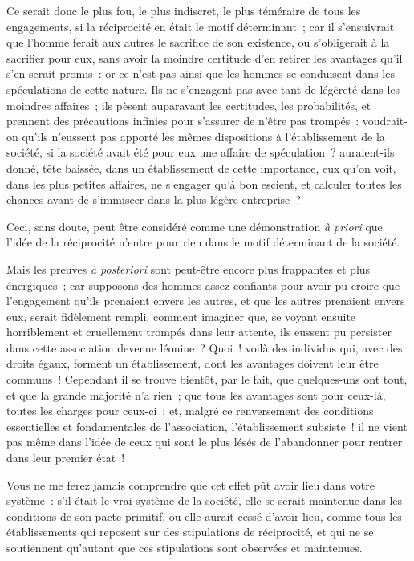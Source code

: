 \documentclass[french,twoside]{book} %
\begin{document}
Ce serait donc le plus fou, le plus indiscret, le plus téméraire de tous les engagements, si la réciprocité en était le motif déterminant ; car il s’ensuivrait que l’homme ferait aux autres le sacrifice de son existence, ou s’obligerait à la sacrifier pour eux, sans avoir la moindre certitude d’en retirer les avantages qu’il s’en serait promis : or ce n’est pas ainsi que les hommes se conduisent dans les spéculations de cette nature. Ils ne s’engagent pas avec tant de légèreté dans les moindres affaires ; ils pèsent auparavant les certitudes, les probabilités, et prennent des précautions infinies pour s’assurer de n’être pas trompés : voudrait-on qu’ils n’eussent pas apporté les mêmes dispositions à l’établissement de la société, si la société avait été pour eux une affaire de spéculation ? auraient-ils donné, tête baissée, dans un établissement de cette importance, eux qu’on voit, dans les plus petites affaires, ne s’engager qu’à bon escient, et calculer toutes les chances avant de s’immiscer dans la plus légère entreprise ?\par
Ceci, sans doute, peut être considéré comme une démonstration {\itshape à priori} que l’idée de la réciprocité n’entre pour rien dans le motif déterminant de la société.\par
Mais les preuves {\itshape à posteriori} sont peut-être encore plus frappantes et plus énergiques ; car supposons des hommes assez confiants pour avoir pu croire que l’engagement qu’ils prenaient envers les autres, et que les autres prenaient envers eux, serait fidèlement rempli, comment imaginer que, se voyant ensuite horriblement et cruellement trompés dans leur attente, ils eussent pu persister dans cette association devenue léonine ? Quoi ! voilà des individus qui, avec des droits égaux, forment un établissement, dont les avantages doivent leur être communs ! Cependant il se trouve bientôt, par le fait, que quelques-uns ont tout, et que la grande majorité n’a rien ; que tous les avantages sont pour ceux-là, toutes les charges pour ceux-ci ; et, malgré ce renversement des conditions essentielles et fondamentales de l’association, l’établissement subsiste ! il ne vient pas même dans l’idée de ceux qui sont le plus lésés de l’abandonner pour rentrer dans leur premier état !\par
Vous ne me ferez jamais comprendre que cet effet pût avoir lieu dans votre système : s’il était le vrai système de la société, elle se serait maintenue dans les conditions de son pacte primitif, ou elle aurait cessé d’avoir lieu, comme tous les établissements qui reposent sur des stipulations de réciprocité, et qui ne se soutiennent qu’autant que ces stipulations sont observées et maintenues.\par
\end{document}
